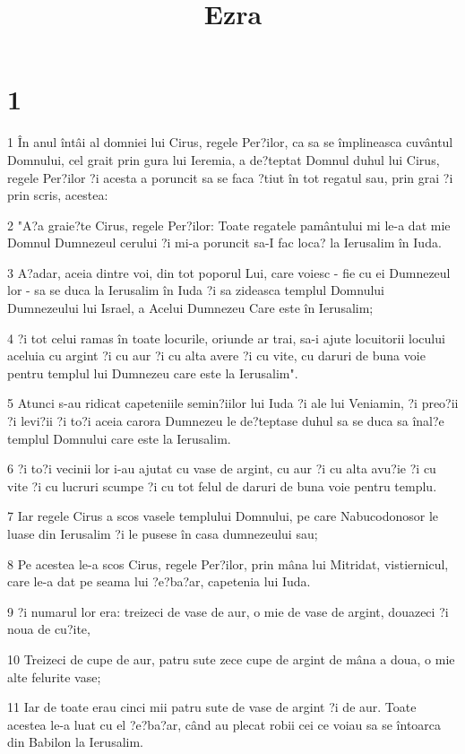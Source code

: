 

\title{Ezra}


\chapter{1}

\par 1 În anul întâi al domniei lui Cirus, regele Per?ilor, ca sa se împlineasca cuvântul Domnului, cel grait prin gura lui Ieremia, a de?teptat Domnul duhul lui Cirus, regele Per?ilor ?i acesta a poruncit sa se faca ?tiut în tot regatul sau, prin grai ?i prin scris, acestea:
\par 2 "A?a graie?te Cirus, regele Per?ilor: Toate regatele pamântului mi le-a dat mie Domnul Dumnezeul cerului ?i mi-a poruncit sa-I fac loca? la Ierusalim în Iuda.
\par 3 A?adar, aceia dintre voi, din tot poporul Lui, care voiesc - fie cu ei Dumnezeul lor - sa se duca la Ierusalim în Iuda ?i sa zideasca templul Domnului Dumnezeului lui Israel, a Acelui Dumnezeu Care este în Ierusalim;
\par 4 ?i tot celui ramas în toate locurile, oriunde ar trai, sa-i ajute locuitorii locului aceluia cu argint ?i cu aur ?i cu alta avere ?i cu vite, cu daruri de buna voie pentru templul lui Dumnezeu care este la Ierusalim".
\par 5 Atunci s-au ridicat capeteniile semin?iilor lui Iuda ?i ale lui Veniamin, ?i preo?ii ?i levi?ii ?i to?i aceia carora Dumnezeu le de?teptase duhul sa se duca sa înal?e templul Domnului care este la Ierusalim.
\par 6 ?i to?i vecinii lor i-au ajutat cu vase de argint, cu aur ?i cu alta avu?ie ?i cu vite ?i cu lucruri scumpe ?i cu tot felul de daruri de buna voie pentru templu.
\par 7 Iar regele Cirus a scos vasele templului Domnului, pe care Nabucodonosor le luase din Ierusalim ?i le pusese în casa dumnezeului sau;
\par 8 Pe acestea le-a scos Cirus, regele Per?ilor, prin mâna lui Mitridat, vistiernicul, care le-a dat pe seama lui ?e?ba?ar, capetenia lui Iuda.
\par 9 ?i numarul lor era: treizeci de vase de aur, o mie de vase de argint, douazeci ?i noua de cu?ite,
\par 10 Treizeci de cupe de aur, patru sute zece cupe de argint de mâna a doua, o mie alte felurite vase;
\par 11 Iar de toate erau cinci mii patru sute de vase de argint ?i de aur. Toate acestea le-a luat cu el ?e?ba?ar, când au plecat robii cei ce voiau sa se întoarca din Babilon la Ierusalim.

